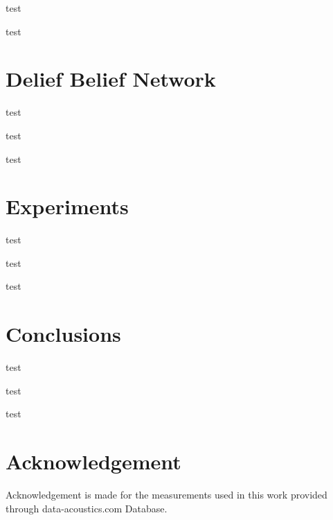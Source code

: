 \documentclass{modified}
\begin{document}
test

test
\section{Delief Belief Network}
test

test

test
\section{Experiments}
test

test

test
\section{Conclusions}
test

test

test
\section*{Acknowledgement}
Acknowledgement is made for the measurements used in this work provided through data-acoustics.com Database.





 
\end{document}
